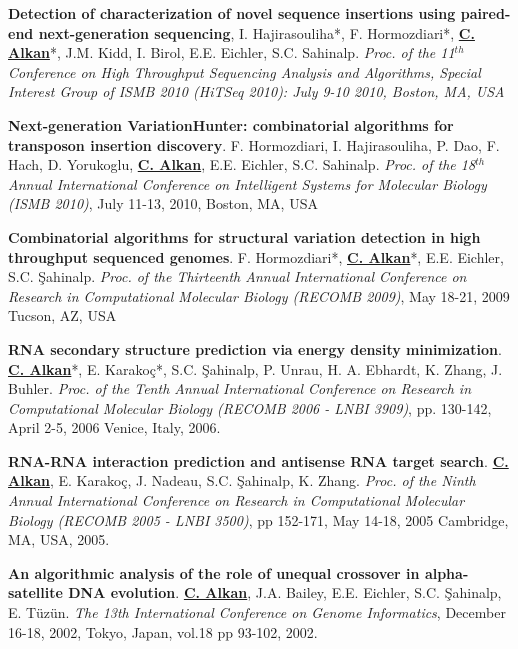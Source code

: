 \documentclass[margin,line]{res}
\begin{document}
\begin{resume}
\vspace{-.2cm}
{\bf Detection of characterization of novel sequence insertions using paired-end next-generation sequencing},
 I. Hajirasouliha*, F. Hormozdiari*, {\bf {\underline{C. Alkan}}}*, J.M. Kidd, I. Birol, E.E. Eichler,
 S.C. Sahinalp.
{\em  Proc. of the 11$^{th}$  Conference on High Throughput Sequencing Analysis and Algorithms, Special Interest
Group of ISMB 2010 (HiTSeq 2010): July 9-10 2010, Boston, MA, USA}

\vspace{-.2cm}
{\bf Next-generation VariationHunter: combinatorial algorithms for transposon insertion discovery}.
F. Hormozdiari, I. Hajirasouliha, P. Dao, F. Hach, D. Yorukoglu, {\bf {\underline{C. Alkan}}},
 E.E. Eichler, S.C. Sahinalp.
{\em Proc. of the 18$^{th}$ Annual International Conference on Intelligent Systems
for Molecular Biology (ISMB 2010)}, July 11-13, 2010, Boston, MA, USA


\vspace{-.2cm}
{\bf  Combinatorial algorithms for structural variation detection in high throughput sequenced genomes}.
F. Hormozdiari*, {\bf {\underline{C. Alkan}}}*, E.E. Eichler, S.C. \c{S}ahinalp.
{\em Proc. of the
 Thirteenth Annual International Conference on Research in Computational Molecular 
Biology (RECOMB 2009)}, May 18-21, 2009 Tucson, AZ, USA

\vspace{-.2cm}
{\bf RNA secondary structure prediction via energy density minimization}.
{\bf {\underline{C. Alkan}}}*, E. Karako\c{c}*, S.C. \c{S}ahinalp, P. Unrau,
H. A. Ebhardt, K. Zhang, J. Buhler.
{\em Proc. of the Tenth Annual International Conference on Research in Computational Molecular Biology
  (RECOMB 2006 - LNBI 3909)}, pp. 130-142,
  April 2-5, 2006 Venice, Italy, 2006.


\vspace{-.2cm}
 {\bf RNA-RNA interaction prediction and antisense RNA target search}.
  {\bf {\underline{C. Alkan}}}, E. Karako\c{c}, J. Nadeau, S.C. \c{S}ahinalp,
  K. Zhang.
  {\em Proc. of the Ninth Annual International Conference on Research in Computational Molecular Biology
    (RECOMB 2005 - LNBI 3500)}, pp 152-171, 
    May 14-18, 2005 Cambridge, MA, USA, 2005.

\vspace{-.2cm}
 {\bf An algorithmic analysis of the role of unequal crossover in
  alpha-satellite DNA evolution}.
  {\bf {\underline{C. Alkan}}}, J.A. Bailey, E.E. Eichler, S.C. \c{S}ahinalp, E. T\"{u}z\"{u}n.
{\em The 13th International Conference on Genome Informatics}, 
December 16-18, 2002, Tokyo, Japan, vol.18 pp 93-102, 2002.


\end{resume}
\end{document}

